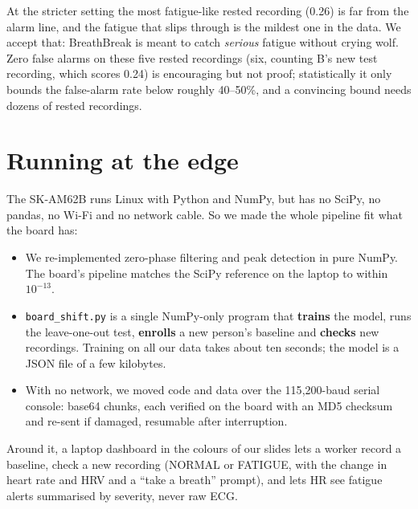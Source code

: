 \documentclass[11pt]{article}
\begin{document}
At the stricter setting the most fatigue-like rested recording (0.26) is far from the alarm line, and the
fatigue that slips through is the mildest one in the data. We accept that: BreathBreak is meant to catch
\emph{serious} fatigue without crying wolf. Zero false alarms on these five rested recordings (six, counting B's new test recording, which scores 0.24) is
encouraging but not proof; statistically it only bounds the false-alarm rate below roughly 40--50\%, and a convincing bound
needs dozens of rested recordings.

\section{Running at the edge}

The SK-AM62B runs Linux with Python and NumPy, but has no SciPy, no pandas, no Wi-Fi and no network cable.
So we made the whole pipeline fit what the board has:

\begin{itemize}
  \item We re-implemented zero-phase filtering and peak detection in pure NumPy. The board's pipeline matches
  the SciPy reference on the laptop to within $10^{-13}$.
  \item \texttt{board\_shift.py} is a single NumPy-only program that \textbf{trains} the model, runs the
  leave-one-out test, \textbf{enrolls} a new person's baseline and \textbf{checks} new recordings. Training on
  all our data takes about ten seconds; the model is a JSON file of a few kilobytes.
  \item With no network, we moved code and data over the 115{,}200-baud serial console: base64 chunks, each
  verified on the board with an MD5 checksum and re-sent if damaged, resumable after interruption.
\end{itemize}

Around it, a laptop dashboard in the colours of our slides lets a worker record a baseline, check a new
recording (NORMAL or FATIGUE, with the change in heart rate and HRV and a ``take a breath'' prompt), and
lets HR see fatigue alerts summarised by severity, never raw ECG.

\begin{center}
\end{center}
\end{document}
